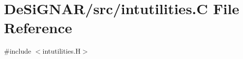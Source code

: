 \hypertarget{intutilities_8_c}{}\section{De\+Si\+G\+N\+A\+R/src/intutilities.C File Reference}
\label{intutilities_8_c}
{\ttfamily \#include $<$intutilities.\+H$>$}\newline
